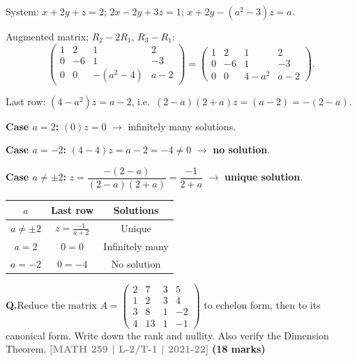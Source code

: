 \documentclass[12pt,a3paper]{article}
\newcommand{\yr}[1]{\hfill\textcolor{gray}{\small\textbf{[#1]}}}
\newcommand{\mk}[1]{\textcolor{orange!70!black}{\small\textbf{(#1 marks)}}}
\newcounter{qnum}
\newcommand{\Q}[1]{%
  \needspace{4\baselineskip}
  \refstepcounter{qnum}
  \vspace{6pt}
  \noindent\textbf{Q\theqnum.}\enspace #1\par
}
\begin{document}
\begin{tcolorbox}[enhanced,breakable,
  colback=cB!4,colframe=cB,boxrule=0.8pt,arc=5pt,
  title={\textbf{Answer --- Values of $a$: Solution Types for 3-Variable System}},
  fonttitle=\bfseries\color{white},colbacktitle=cB]

System: $x+2y+z=2$;\; $2x-2y+3z=1$;\; $x+2y-(a^2-3)z=a$.

Augmented matrix; $R_2-2R_1$, $R_3-R_1$:
\[
\begin{pmatrix}1&2&1&2\\0&-6&1&-3\\0&0&-(a^2-4)&a-2\end{pmatrix}
= \begin{pmatrix}1&2&1&2\\0&-6&1&-3\\0&0&4-a^2&a-2\end{pmatrix}.
\]

Last row: $(4-a^2)z=a-2$, i.e.\ $(2-a)(2+a)z=(a-2)=-(2-a)$.

\textbf{Case $a=2$:} $(0)z=0$ $\to$ infinitely many solutions.

\textbf{Case $a=-2$:} $(4-4)z=a-2=-4\neq0$ $\to$ \textbf{no solution}.

\textbf{Case $a\neq\pm2$:} $z=\dfrac{-(2-a)}{(2-a)(2+a)}=\dfrac{-1}{2+a}$ $\to$ \textbf{unique solution}.

\begin{center}
\small\begin{tabular}{@{}ccc@{}}
\toprule
$a$ & Last row & Solutions \\
\midrule
$a\neq\pm2$ & $z=\frac{-1}{a+2}$ & Unique \\
$a=2$ & $0=0$ & Infinitely many \\
$a=-2$ & $0=-4$ & No solution \\
\bottomrule
\end{tabular}
\end{center}

\end{tcolorbox}



\Q{Reduce the matrix $A = \begin{pmatrix} 2 & 7 & 3 & 5 \\ 1 & 2 & 3 & 4 \\ 3 & 8 & 1 & -2 \\ 4 & 13 & 1 & -1 \end{pmatrix}$ to echelon form, then to its canonical form. Write down the rank and nullity. Also verify the Dimension Theorem.
\yr{MATH 259 | L-2/T-1 | 2021-22} \mk{18}}
\end{document}
